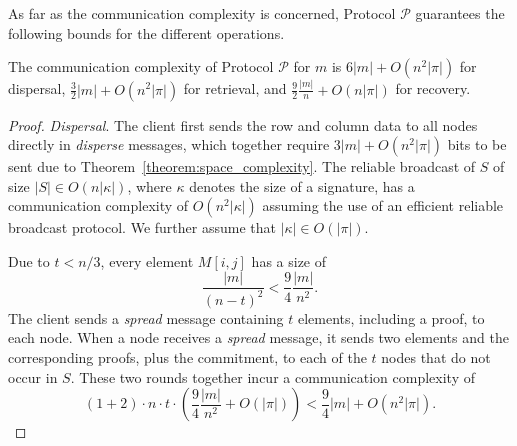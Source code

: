 \documentclass[sigconf,screen]{acmart}
\begin{document}
As far as the communication complexity is concerned, Protocol $\mathcal{P}$ guarantees the following bounds for the different operations.

\begin{theorem}
The communication complexity of Protocol $\mathcal{P}$ for $m$ is
 $6|m| + O(n^2|\pi|)$ for dispersal,
 $\frac{3}{2}|m| + O(n^2|\pi|)$ for retrieval, and
 $\frac{9}{2}\frac{|m|}{n} + O(n|\pi|)$ for recovery.
\end{theorem}
\begin{proof}
\emph{Dispersal}. The client first sends the row and column data to all nodes directly in \emph{disperse} messages, which together require $3|m|+O(n^2|\pi|)$ bits to be sent due to Theorem~\ref{theorem:space_complexity}. The reliable broadcast of $S$ of size $|S| \in O(n|\kappa|)$, where $\kappa$ denotes the size of a signature, has a communication complexity of $O(n^2|\kappa|)$ assuming the use of an efficient reliable broadcast protocol. We further assume that $|\kappa| \in O(|\pi|)$.

Due to $t < n/3$, every element $M[i,j]$ has a size of $$\frac{|m|}{(n-t)^2} < \frac{9}{4}\frac{|m|}{n^2}.$$
The client sends a \emph{spread} message containing $t$ elements, including a proof, to each node. When a node receives a 
\emph{spread} message, it sends two elements and the corresponding proofs, plus the commitment, to each of the $t$ nodes that do not occur in $S$. These two rounds together incur a communication complexity of
$$(1 + 2)\cdot n \cdot t \cdot \left(\frac{9}{4}\frac{|m|}{n^2} + O(|\pi|)\right) < \frac{9}{4}|m| + O(n^2|\pi|).$$


\end{proof}
\end{document}
